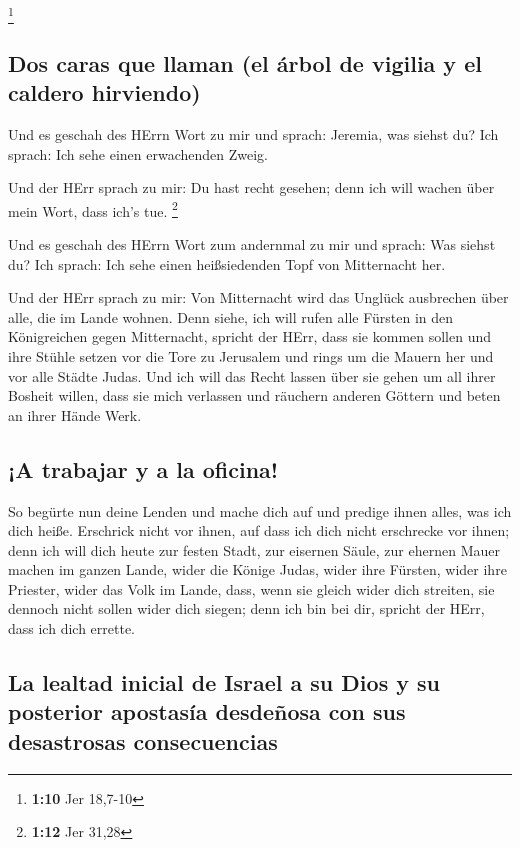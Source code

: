 \footnote{\textbf{1:10} Jer 18,7-10}

\hypertarget{dos-caras-que-llaman-el-uxe1rbol-de-vigilia-y-el-caldero-hirviendo}{%
\subsection{Dos caras que llaman (el árbol de vigilia y el caldero
hirviendo)}\label{dos-caras-que-llaman-el-uxe1rbol-de-vigilia-y-el-caldero-hirviendo}}

 Und es geschah des HErrn Wort zu mir und sprach:
Jeremia, was siehst du? Ich sprach: Ich sehe einen erwachenden Zweig.

 Und der HErr sprach zu mir: Du hast recht gesehen; denn
ich will wachen über mein Wort, dass ich's tue. \footnote{\textbf{1:12}
  Jer 31,28}

 Und es geschah des HErrn Wort zum andernmal zu mir und
sprach: Was siehst du? Ich sprach: Ich sehe einen heißsiedenden Topf von
Mitternacht her.

 Und der HErr sprach zu mir: Von Mitternacht wird das
Unglück ausbrechen über alle, die im Lande wohnen.  Denn
siehe, ich will rufen alle Fürsten in den Königreichen gegen
Mitternacht, spricht der HErr, dass sie kommen sollen und ihre Stühle
setzen vor die Tore zu Jerusalem und rings um die Mauern her und vor
alle Städte Judas.  Und ich will das Recht lassen über
sie gehen um all ihrer Bosheit willen, dass sie mich verlassen und
räuchern anderen Göttern und beten an ihrer Hände Werk.

\hypertarget{a-trabajar-y-a-la-oficina}{%
\subsection{¡A trabajar y a la
oficina!}\label{a-trabajar-y-a-la-oficina}}

 So begürte nun deine Lenden und mache dich auf und
predige ihnen alles, was ich dich heiße. Erschrick nicht vor ihnen, auf
dass ich dich nicht erschrecke vor ihnen;  denn ich will
dich heute zur festen Stadt, zur eisernen Säule, zur ehernen Mauer
machen im ganzen Lande, wider die Könige Judas, wider ihre Fürsten,
wider ihre Priester, wider das Volk im Lande,  dass, wenn
sie gleich wider dich streiten, sie dennoch nicht sollen wider dich
siegen; denn ich bin bei dir, spricht der HErr, dass ich dich errette.

\hypertarget{la-lealtad-inicial-de-israel-a-su-dios-y-su-posterior-apostasuxeda-desdeuxf1osa-con-sus-desastrosas-consecuencias}{%
\subsection{La lealtad inicial de Israel a su Dios y su posterior
apostasía desdeñosa con sus desastrosas
consecuencias}\label{la-lealtad-inicial-de-israel-a-su-dios-y-su-posterior-apostasuxeda-desdeuxf1osa-con-sus-desastrosas-consecuencias}}

